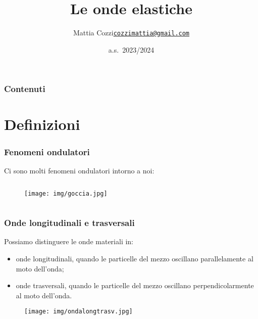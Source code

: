 \documentclass[]{beamer}
\title{Le onde elastiche}
\author{\texorpdfstring{Mattia Cozzi\newline\href{mailto:cozzimattia@gmail.com}{\texttt{cozzimattia@gmail.com}}}{Mattia Cozzi}}
\date{a.s.~2023/2024}
\theoremstyle{plain}
\begin{document}
\begin{frame}
  \titlepage
\end{frame}





\begin{frame}
\frametitle{Contenuti}
\tableofcontents
\end{frame}


\section{Definizioni}




\begin{frame}
  \frametitle{Fenomeni ondulatori}
  Ci sono molti fenomeni ondulatori intorno a noi:
  \begin{columns}
    \begin{column}{0.3\textwidth}
      \begin{figure}
        \texttt{[image: img/goccia.jpg]}
      \end{figure}
    \end{column}
    \begin{column}{0.3\textwidth}
    \end{column}
    \begin{column}{0.3\textwidth}
    \end{column}
  \end{columns}
\end{frame}

\begin{frame}
  \frametitle{Onde longitudinali e trasversali}
Possiamo distinguere le onde materiali in:
\begin{itemize}
  \item \alert<1>{onde longitudinali}, quando le particelle del mezzo oscillano \alert<1>{parallelamente} al moto dell'onda;\pause
  \item \alert<2>{onde trasversali}, quando le particelle del mezzo oscillano \alert<2>{perpendicolarmente} al moto dell'onda.
  \end{itemize}
  \begin{figure}
        \texttt{[image: img/ondalongtrasv.jpg]}
      \end{figure}
\end{frame}
\end{document}
